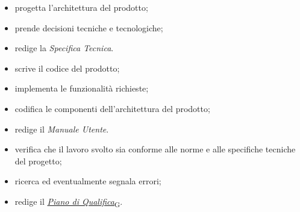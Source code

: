 \begin{itemize}
    \item progetta l'architettura del prodotto;
    \item prende decisioni tecniche e tecnologiche;
    \item redige la \textit{Specifica Tecnica}.
\end{itemize}

\begin{itemize}
    \item scrive il codice del prodotto;
    \item implementa le funzionalità richieste;
    \item codifica le componenti dell'architettura del prodotto;
    \item redige il \textit{Manuale Utente}. 
\end{itemize}

\begin{itemize}
    \item verifica che il lavoro svolto sia conforme alle norme e alle specifiche tecniche del progetto;
    \item ricerca ed eventualmente segnala errori;
    \item redige il \href{https://7last.github.io/docs/pb/documentazione-interna/glossario\#piano-di-qualifica}{\textit{Piano di Qualifica}\textsubscript{G}}.
\end{itemize}

